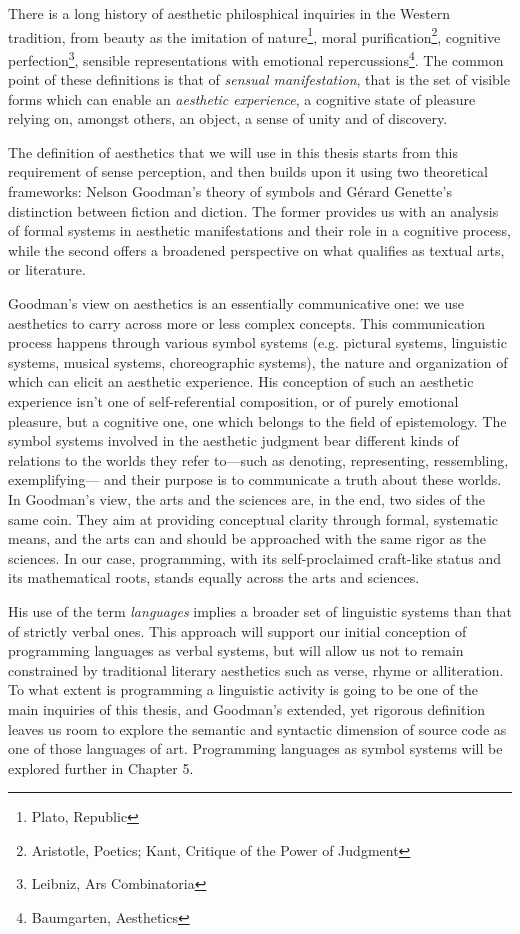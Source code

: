There is a long history of aesthetic philosphical inquiries in the Western tradition, from beauty as the imitation of nature\footnote{Plato, Republic}, moral purification\footnote{Aristotle, Poetics; Kant, Critique of the Power of Judgment}, cognitive perfection\footnote{Leibniz, Ars Combinatoria}, sensible representations with emotional repercussions\footnote{Baumgarten, Aesthetics}. The common point of these definitions is that of \emph{sensual manifestation}, that is the set of visible forms which can enable an \emph{aesthetic experience}, a cognitive state of pleasure relying on, amongst others, an object, a sense of unity and of discovery\cite{beardsley_aesthetic_1970}.

The definition of aesthetics that we will use in this thesis starts from this requirement of sense perception, and then builds upon it using two theoretical frameworks: Nelson Goodman's theory of symbols\cite{goodman_languages_1976} and Gérard Genette's distinction between fiction and diction\cite{genette_fiction_1993}. The former provides us with an analysis of formal systems in aesthetic manifestations and their role in a cognitive process, while the second offers a broadened perspective on what qualifies as textual arts, or literature.

Goodman's view on aesthetics is an essentially communicative one: we use aesthetics to carry across more or less complex concepts. This communication process happens through various symbol systems (e.g. pictural systems, linguistic systems, musical systems, choreographic systems), the nature and organization of which can elicit an aesthetic experience. His conception of such an aesthetic experience isn't one of self-referential composition, or of purely emotional pleasure, but a cognitive one, one which belongs to the field of epistemology\cite{goodman_languages_1976}. The symbol systems involved in the aesthetic judgment bear different kinds of relations to the worlds they refer to—such as denoting, representing, ressembling, exemplifying— and their purpose is to communicate a truth about these worlds\cite{goodman_ways_1978}. In Goodman's view, the arts and the sciences are, in the end, two sides of the same coin. They aim at providing conceptual clarity through formal, systematic means, and the arts can and should be approached with the same rigor as the sciences. In our case, programming, with its self-proclaimed craft-like status and its mathematical roots, stands equally across the arts and sciences.

His use of the term \emph{languages} implies a broader set of linguistic systems than that of strictly verbal ones. This approach will support our initial conception of programming languages as verbal systems, but will allow us not to remain constrained by traditional literary aesthetics such as verse, rhyme or alliteration. To what extent is programming a linguistic activity is going to be one of the main inquiries of this thesis, and Goodman's extended, yet rigorous definition leaves us room to explore the semantic and syntactic dimension of source code as one of those languages of art. Programming languages as symbol systems will be explored further in Chapter 5.

